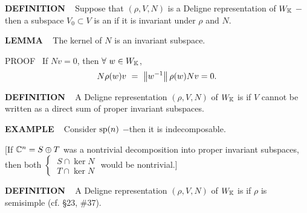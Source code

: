 \vspace{0.1cm}


\begin{x}{\small\bf DEFINITION} \ %
Suppose that $(\rho,V,N)$ is a Deligne representation of $W_{\mathbb{K}}$ $-$then a subspace $V_0 \subset V$ is an 
if it is invariant under $\rho$ and $N$.
\end{x}
\vspace{0.1cm}

\begin{x}{\small\bf LEMMA} \ %
The kernel of $N$ is an invariant subspace. 

\vspace{0.1cm}

PROOF \ 
If $N v = 0$, then $\forall \ w \in W_{\mathbb{K}}$, 
\[
N \rho (w) v \ = \ \left\lVert w^{-1} \right\rVert \rho(w) N v = 0.
\]
\end{x}

\vspace{0.1cm}

\begin{x}{\small\bf DEFINITION} \ %
A Deligne representation $(\rho,V,N)$ of $W_{\mathbb{K}}$ is 
if $V$ cannot be written as a direct sum of proper 
invariant subspaces.
\end{x}

\vspace{0.1cm}

\begin{x}{\small\bf EXAMPLE} \ %
Consider $\text{sp}(n)$ $-$then it is indecomposable.

\vspace{0.1cm}

[If $\mathbb{C}^n = S \oplus T$ was a nontrivial decomposition into  proper invariant subspaces, then both
$
\begin{cases}
\ S \cap \ker N\\
\ T \cap \ker N
\end{cases}
$
would be nontrivial.]
\end{x}
\vspace{0.1cm}

\begin{x}{\small\bf DEFINITION} \ %
A Deligne representation $(\rho,V,N)$ of $W_{\mathbb{K}}$ is 
if $\rho$ is semisimple (cf. \S23, \#37).
\end{x}

